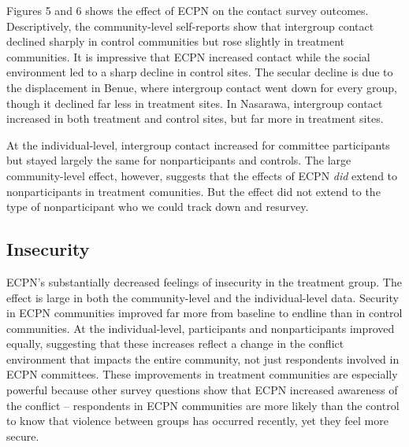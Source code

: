 \documentclass[]{article}
\begin{document}
Figures 5 and 6 shows the effect of ECPN on the contact survey outcomes.
Descriptively, the community-level self-reports show that intergroup
contact declined sharply in control communities but rose slightly in
treatment communities. It is impressive that ECPN increased contact
while the social environment led to a sharp decline in control sites.
The secular decline is due to the displacement in Benue, where
intergroup contact went down for every group, though it declined far
less in treatment sites. In Nasarawa, intergroup contact increased in
both treatment and control sites, but far more in treatment sites.

At the individual-level, intergroup contact increased for committee
participants but stayed largely the same for nonparticipants and
controls. The large community-level effect, however, suggests that the
effects of ECPN \emph{did} extend to nonparticipants in treatment
comunities. But the effect did not extend to the type of nonparticipant
who we could track down and resurvey.

\hypertarget{insecurity}{%
\subsection{Insecurity}\label{insecurity}}

ECPN's substantially decreased feelings of insecurity in the treatment
group. The effect is large in both the community-level and the
individual-level data. Security in ECPN communities improved far more
from baseline to endline than in control communities. At the
individual-level, participants and nonparticipants improved equally,
suggesting that these increases reflect a change in the conflict
environment that impacts the entire community, not just respondents
involved in ECPN committees. These improvements in treatment communities
are especially powerful because other survey questions show that ECPN
increased awareness of the conflict -- respondents in ECPN communities
are more likely than the control to know that violence between groups
has occurred recently, yet they feel more secure.
\end{document}
